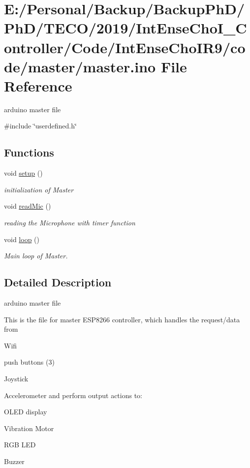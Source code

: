 \hypertarget{master_8ino}{}\section{E\+:/\+Personal/\+Backup/\+Backup\+Ph\+D/\+Ph\+D/\+T\+E\+C\+O/2019/\+Int\+Ense\+Cho\+I\+\_\+\+Controller/\+Code/\+Int\+Ense\+Cho\+I\+R9/code/master/master.ino File Reference}
\label{master_8ino}


arduino master file  


{\ttfamily \#include \char`\"{}userdefined.\+h\char`\"{}}\newline
\subsection*{Functions}
\begin{DoxyCompactItemize}
\item 
void \mbox{\hyperlink{master_8ino_a4fc01d736fe50cf5b977f755b675f11d}{setup}} ()
\begin{DoxyCompactList}\small\item\em initialization of Master \end{DoxyCompactList}\item 
void \mbox{\hyperlink{master_8ino_acb567cd7c0b4da511205a0194cb9da81}{read\+Mic}} ()
\begin{DoxyCompactList}\small\item\em reading the Microphone with timer function \end{DoxyCompactList}\item 
void \mbox{\hyperlink{master_8ino_afe461d27b9c48d5921c00d521181f12f}{loop}} ()
\begin{DoxyCompactList}\small\item\em Main loop of Master. \end{DoxyCompactList}\end{DoxyCompactItemize}


\subsection{Detailed Description}
arduino master file 

This is the file for master E\+S\+P8266 controller, which handles the request/data from
\begin{DoxyItemize}
\item Wifi
\item push buttons (3)
\item Joystick
\item Accelerometer and perform output actions to\+:
\item O\+L\+ED display
\item Vibration Motor
\item R\+GB L\+ED
\item Buzzer
\end{DoxyItemize}

